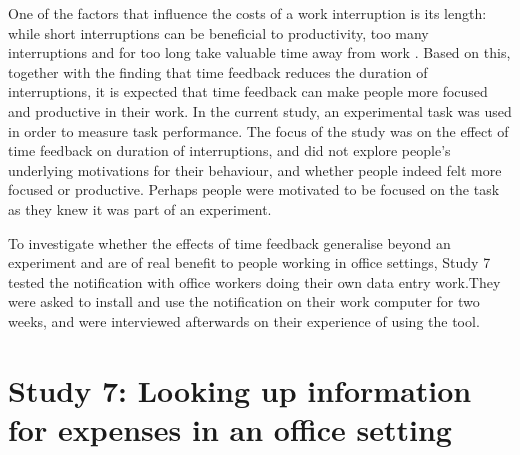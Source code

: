 One of the factors that influence the costs of a work interruption is its length: while short interruptions can be beneficial to productivity, too many interruptions and for too long take valuable time away from work \citep{Mark2018}. Based on this, together with the finding that time feedback reduces the duration of interruptions, it is expected that time feedback can make people more focused and productive in their work.  In the current study, an experimental task was used in order to measure task performance. The focus of the study was on the effect of time feedback on duration of interruptions, and did not explore people's underlying motivations for their behaviour, and whether people indeed felt more focused or productive. Perhaps people were motivated to be focused on the task as they knew it was part of an experiment.

To investigate whether the effects of time feedback generalise beyond an experiment and are of real benefit to people working in office settings, Study 7 tested the notification with office workers doing their own data entry work.They were asked to install and use the notification on their work computer for two weeks, and were interviewed afterwards on their experience of using the tool.


\section{Study 7: Looking up information for expenses in an office setting}\label{st:Study7}

